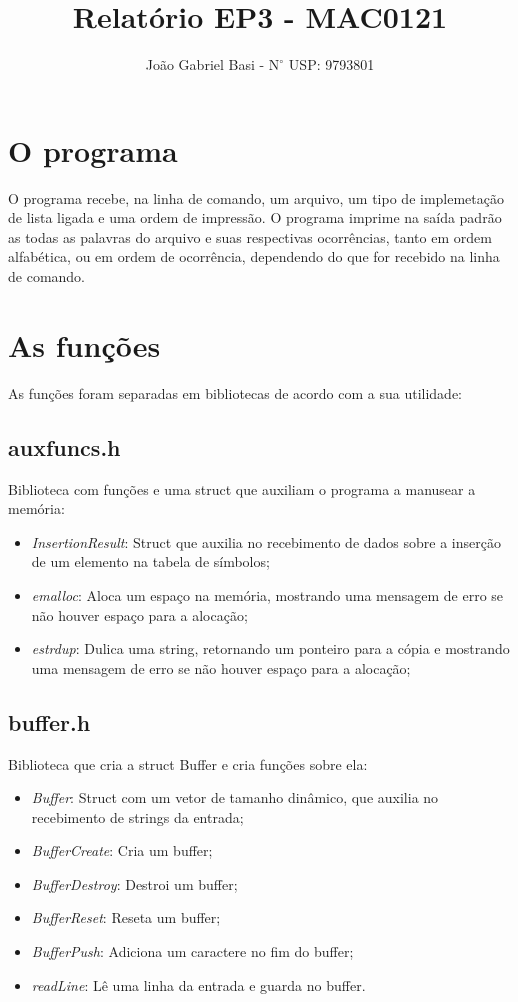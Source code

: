 \documentclass[12pt, a4paper]{article} %
\title{Relatório EP3 - MAC0121}
\date{}
\author{João Gabriel Basi - $\text{N}^\circ$ USP: 9793801}
\begin{document}
\maketitle
\section{O programa}
O programa recebe, na linha de comando, um arquivo, um tipo de implemetação de lista ligada e uma ordem de impressão. O programa imprime na saída padrão as todas as palavras do arquivo e suas respectivas ocorrências, tanto em ordem alfabética, ou em ordem de ocorrência, dependendo do que for recebido na linha de comando.

\section{As funções}
As funções foram separadas em bibliotecas de acordo com a sua utilidade:
	\subsection{auxfuncs.h}
	Biblioteca com funções e uma struct que auxiliam o programa a manusear a memória:
	\begin{itemize}
		\item \textit{InsertionResult}: Struct que auxilia no recebimento de dados sobre a inserção de um elemento na tabela de símbolos;
		\item \textit{emalloc}: Aloca um espaço na memória, mostrando uma mensagem de erro se não houver espaço para a alocação;
		\item \textit{estrdup}: Dulica uma string, retornando um ponteiro para a cópia e mostrando uma mensagem de erro se não houver espaço para a alocação;
	\end{itemize}

	\subsection{buffer.h}
	Biblioteca que cria a struct Buffer e cria funções sobre ela:
	\begin{itemize}
		\item \textit{Buffer}: Struct com um vetor de tamanho dinâmico, que auxilia no recebimento de strings da entrada;
		\item \textit{BufferCreate}: Cria um buffer;
		\item \textit{BufferDestroy}: Destroi um buffer;
		\item \textit{BufferReset}: Reseta um buffer;
		\item \textit{BufferPush}: Adiciona um caractere no fim do buffer;
		\item \textit{readLine}: Lê uma linha da entrada e guarda no buffer.
	\end{itemize}
\end{document}
